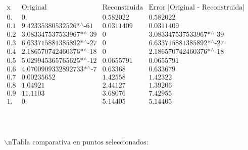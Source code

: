 \documentclass{article}
\begin{document}
\noindent\(\begin{array}{cccc}
 \text{x} & \text{Original} & \text{Reconstruida} & \text{Error $|$Original - Reconstruida$|$} \\
 0. & 0. & 0.582022 & 0.582022 \\
 0.1 & \text{9.42335380532526$\grave{ }$*${}^{\wedge}$-61} & 0.0311409 & 0.0311409 \\
 0.2 & \text{3.083347537533967$\grave{ }$*${}^{\wedge}$-39} & 0 & \text{3.083347537533967$\grave{ }$*${}^{\wedge}$-39} \\
 0.3 & \text{6.633715881385892$\grave{ }$*${}^{\wedge}$-27} & 0 & \text{6.633715881385892$\grave{ }$*${}^{\wedge}$-27} \\
 0.4 & \text{2.186570742460376$\grave{ }$*${}^{\wedge}$-18} & 0 & \text{2.186570742460376$\grave{ }$*${}^{\wedge}$-18} \\
 0.5 & \text{5.029945365765625$\grave{ }$*${}^{\wedge}$-12} & 0.0655791 & 0.0655791 \\
 0.6 & \text{4.0700909332892733$\grave{ }$*${}^{\wedge}$-7} & 0.63368 & 0.633679 \\
 0.7 & 0.00235652 & 1.42558 & 1.42322 \\
 0.8 & 1.04921 & 2.44127 & 1.39206 \\
 0.9 & 11.1103 & 3.68076 & 7.42955 \\
 1. & 0. & 5.14405 & 5.14405 \\
\end{array}\)

\noindent\(\begin{array}{cc}
 
\begin{array}{cc}
  &  \\
\end{array}
 &  \\
\end{array}\)

\noindent\(\text{$\backslash $nTabla comparativa en puntos seleccionados:}\)
\end{document}
